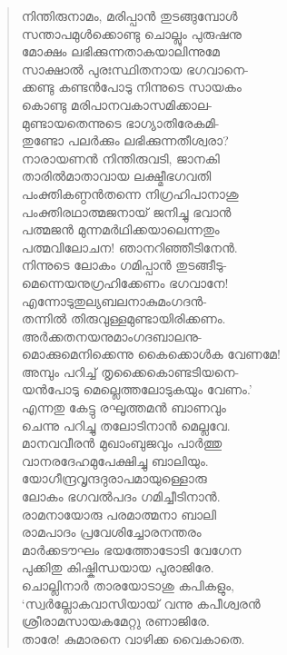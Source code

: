 \begin{verse}
നിന്തിരുനാമം, മരിപ്പാന്‍ തുടങ്ങുമ്പോള്‍\\
സന്താപമുള്‍ക്കൊണ്ടു ചൊല്ലും പുരുഷനു\\
മോക്ഷം ലഭിക്കുന്നതാകയാലിന്നുമേ\\
സാക്ഷാല്‍ പുരഃസ്ഥിതനായ ഭഗവാനെ-\\
ക്കണ്ടു കണ്ടന്‍പോടു നിന്നുടെ സായകം\\
കൊണ്ടു മരിപാനവകാസമിക്കാല-\\
മുണ്ടായതെന്നുടെ ഭാഗ്യാതിരേകമി-\\
തുണ്ടോ പലര്‍ക്കും ലഭിക്കുന്നതീശ്വരാ?\\
നാരായണന്‍ നിന്തിരുവടി, ജാനകി\\
താരില്‍മാതാവായ ലക്ഷ്മീഭഗവതി\\
പംക്തികണ്ഠന്‍തന്നെ നിഗ്രഹിപാനാശു\\
പംക്തിരഥാത്മജനായ് ജനിച്ചു ഭവാന്‍\\
പത്മജന്‍ മുന്നമര്‍ഥിക്കയാലെന്നതും\\
പത്മവിലോചന! ഞാനറിഞ്ഞീടിനേന്‍.\\
നിന്നുടെ ലോകം ഗമിപ്പാന്‍ തുടങ്ങീടു-\\
മെന്നെയനുഗ്രഹിക്കേണം ഭഗവാനേ!\\
എന്നോടുതുല്യബലനാകുമംഗദന്‍-\\
തന്നില്‍ തിരുവുള്ളമുണ്ടായിരിക്കണം.\\
അര്‍ക്കതനയനുമാംഗദബാലനു-\\
മൊക്കുമെനിക്കെന്നു കൈക്കൊള്‍ക വേണമേ!\\
അമ്പും പറിച്ച് തൃക്കൈകൊണ്ടടിയനെ-\\
യന്‍പോടു മെല്ലെത്തലോടുകയും വേണം.’\\
എന്നതു കേട്ടു രഘൂത്തമന്‍ ബാണവും\\
ചെന്നു പറിച്ചു തലോടിനാന്‍ മെല്ലവേ.\\
മാനവവീരന്‍ മുഖാംബുജവും പാര്‍ത്തു\\
വാനരദേഹമുപേക്ഷിച്ചു ബാലിയും.\\
യോഗീന്ദ്രവൃന്ദദുരാപമായുള്ളൊരു\\
ലോകം ഭഗവല്‍പദം ഗമിച്ചീടിനാന്‍.\\
രാമനായോരു പരമാത്മനാ ബാലി\\
രാമപാദം പ്രവേശിച്ചോരനന്തരം\\
മാര്‍ക്കടൗഘം ഭയത്തോടോടി വേഗേന\\
പുക്കിതു കിഷ്കിന്ധയായ പുരാജിരേ.\\
ചൊല്ലിനാര്‍ താരയോടാശു കപികളും,\\
‘സ്വര്‍ല്ലോകവാസിയായ് വന്നു കപീശ്വരന്‍\\
ശ്രീരാമസായകമേറ്റു രണാജിരേ.\\
താരേ! കുമാരനെ വാഴിക്ക വൈകാതെ.\\

\end{verse}
